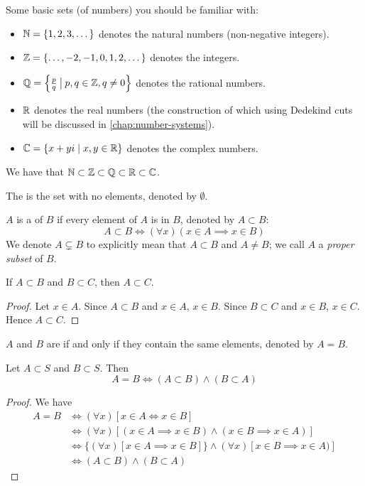 Some basic sets (of numbers) you should be familiar with:
\begin{itemize}
\item $\mathbb N=\{1,2,3,\dots\}$ denotes the natural numbers (non-negative integers).
\item $\mathbb Z=\{\dots,-2,-1,0,1,2,\dots\}$ denotes the integers.
\item $\mathbb Q=\left\{\frac{p}{q}\:\big|\:p,q\in\mathbb Z, q\neq0\right\}$ denotes the rational numbers.
\item $\mathbb R$ denotes the real numbers (the construction of which using Dedekind cuts will be discussed in \cref{chap:number-systems}).
\item $\mathbb C=\{x+yi \mid x,y\in\mathbb R\}$ denotes the complex numbers.
\end{itemize}

We have that $\mathbb N\subset\mathbb Z\subset\mathbb Q\subset\mathbb R\subset\mathbb C$.

The  is the set with no elements, denoted by $\emptyset$.

$A$ is a  of $B$ if every element of $A$ is in $B$, denoted by $A\subset B$:
\[A\subset B\iff(\forall x)(x\in A \implies x\in B)\]
We denote $A\subsetneq B$ to explicitly mean that $A\subset B$ and $A\neq B$; we call $A$ a \emph{proper subset} of $B$.

\begin{lemma}
If $A \subset B$ and $B \subset C$, then $A \subset C$.
\end{lemma}

\begin{proof}
Let $x\in A$. 
Since $A \subset B$ and $x\in A$, $x\in B$. 
Since $B \subset C$ and $x\in B$, $x\in C$. 
Hence $A \subset C$.
\end{proof}

$A$ and $B$ are  if and only if they contain the same elements, denoted by $A=B$. 

\begin{lemma}
Let $A\subset S$ and $B\subset S$. Then
\[A=B\iff (A\subset B)\land(B\subset A)\]
\end{lemma}

\begin{proof}
We have 
\begin{align*}
A = B &\iff (\forall x)[x \in A \iff x \in B] \\
&\iff (\forall x)[(x \in A \implies x \in B) \land (x \in B \implies x \in A)] \\
&\iff \{(\forall x)[x \in A \implies x \in B]\} \land {(\forall x)[x \in B \implies x \in A)]} \\
&\iff (A \subset B) \land (B \subset A)
\end{align*}
\end{proof}

